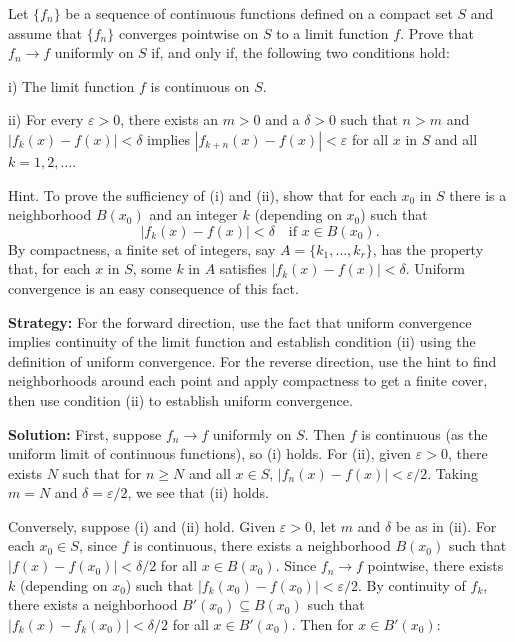 \begin{problembox}
\begin{problemstatement}
Let \( \{f_n\} \) be a sequence of continuous functions defined on a compact set \( S \) and assume that \( \{f_n\} \) converges pointwise on \( S \) to a limit function \( f \). Prove that \( f_n \to f \) uniformly on \( S \) if, and only if, the following two conditions hold:

i) The limit function \( f \) is continuous on \( S \).

ii) For every \( \varepsilon > 0 \), there exists an \( m > 0 \) and a \( \delta > 0 \) such that \( n > m \) and \( |f_k(x) - f(x)| < \delta \) implies \( |f_{k+n}(x) - f(x)| < \varepsilon \) for all \( x \) in \( S \) and all \( k = 1, 2, \ldots \).

Hint. To prove the sufficiency of (i) and (ii), show that for each \( x_0 \) in \( S \) there is a neighborhood \( B(x_0) \) and an integer \( k \) (depending on \( x_0 \)) such that
\[|f_k(x) - f(x)| < \delta \quad \text{if } x \in B(x_0).\]
By compactness, a finite set of integers, say \( A = \{k_1, \ldots, k_r\} \), has the property that, for each \( x \) in \( S \), some \( k \) in \( A \) satisfies \( |f_k(x) - f(x)| < \delta \). Uniform convergence is an easy consequence of this fact.
\end{problemstatement}
\end{problembox}

\noindent\textbf{Strategy:} For the forward direction, use the fact that uniform convergence implies continuity of the limit function and establish condition (ii) using the definition of uniform convergence. For the reverse direction, use the hint to find neighborhoods around each point and apply compactness to get a finite cover, then use condition (ii) to establish uniform convergence.

\bigskip\noindent\textbf{Solution:} First, suppose \( f_n \to f \) uniformly on \( S \). Then \( f \) is continuous (as the uniform limit of continuous functions), so (i) holds. For (ii), given \( \varepsilon > 0 \), there exists \( N \) such that for \( n \geq N \) and all \( x \in S \), \( |f_n(x) - f(x)| < \varepsilon/2 \). Taking \( m = N \) and \( \delta = \varepsilon/2 \), we see that (ii) holds.

Conversely, suppose (i) and (ii) hold. Given \( \varepsilon > 0 \), let \( m \) and \( \delta \) be as in (ii). For each \( x_0 \in S \), since \( f \) is continuous, there exists a neighborhood \( B(x_0) \) such that \( |f(x) - f(x_0)| < \delta/2 \) for all \( x \in B(x_0) \). Since \( f_n \to f \) pointwise, there exists \( k \) (depending on \( x_0 \)) such that \( |f_k(x_0) - f(x_0)| < \varepsilon/2 \). By continuity of \( f_k \), there exists a neighborhood \( B'(x_0) \subseteq B(x_0) \) such that \( |f_k(x) - f_k(x_0)| < \delta/2 \) for all \( x \in B'(x_0) \). Then for \( x \in B'(x_0) \):

